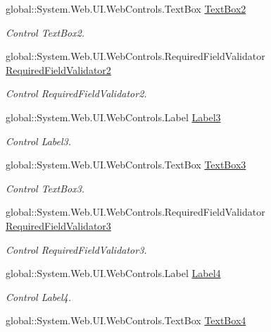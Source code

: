\begin{DoxyCompactItemize}
global\+::\+System.\+Web.\+U\+I.\+Web\+Controls.\+Text\+Box \mbox{\hyperlink{classInicio_1_1CambiarPassword_a7eeeb21567b9f20fcb890fbffc4146f4}{Text\+Box2}}
\begin{DoxyCompactList}\small\item\em Control Text\+Box2. \end{DoxyCompactList}\item 
global\+::\+System.\+Web.\+U\+I.\+Web\+Controls.\+Required\+Field\+Validator \mbox{\hyperlink{classInicio_1_1CambiarPassword_a955b645fae496e6d030ac5da64663fc7}{Required\+Field\+Validator2}}
\begin{DoxyCompactList}\small\item\em Control Required\+Field\+Validator2. \end{DoxyCompactList}\item 
global\+::\+System.\+Web.\+U\+I.\+Web\+Controls.\+Label \mbox{\hyperlink{classInicio_1_1CambiarPassword_a4aa07cf906d98059cf6158cf3e31800a}{Label3}}
\begin{DoxyCompactList}\small\item\em Control Label3. \end{DoxyCompactList}\item 
global\+::\+System.\+Web.\+U\+I.\+Web\+Controls.\+Text\+Box \mbox{\hyperlink{classInicio_1_1CambiarPassword_affa43c3fb9f3daacfb67965c2c50466f}{Text\+Box3}}
\begin{DoxyCompactList}\small\item\em Control Text\+Box3. \end{DoxyCompactList}\item 
global\+::\+System.\+Web.\+U\+I.\+Web\+Controls.\+Required\+Field\+Validator \mbox{\hyperlink{classInicio_1_1CambiarPassword_a618ca28dc9312f747d6f48cc9b11f132}{Required\+Field\+Validator3}}
\begin{DoxyCompactList}\small\item\em Control Required\+Field\+Validator3. \end{DoxyCompactList}\item 
global\+::\+System.\+Web.\+U\+I.\+Web\+Controls.\+Label \mbox{\hyperlink{classInicio_1_1CambiarPassword_a5c90deffe35773405ff5ec7a875eb035}{Label4}}
\begin{DoxyCompactList}\small\item\em Control Label4. \end{DoxyCompactList}\item 
global\+::\+System.\+Web.\+U\+I.\+Web\+Controls.\+Text\+Box \mbox{\hyperlink{classInicio_1_1CambiarPassword_a9365f80de4f65ec031a704d80d0b5c51}{Text\+Box4}}

\end{DoxyCompactItemize}
